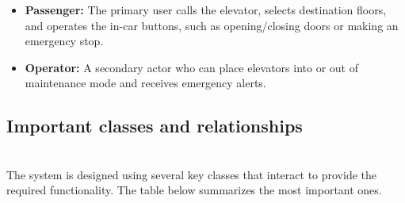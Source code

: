 \begin{itemize}
\item
\protect{}\label{2VJPYTyXepnmsSZQZ0NRs}
\textbf{Passenger:} The primary user calls the elevator, selects destination floors, and operates the in-car buttons, such as opening/closing doors or making an emergency stop.
\item
\protect{}\label{3ZUK4t2rGIq6sjB-JmLyc}
\textbf{Operator:} A secondary actor who can place elevators into or out of maintenance mode and receives emergency alerts.
\end{itemize}

\subsection{Important classes and relationships}\label{Q6YBtvgV3AELvMhCanKTC}
\\
The system is designed using several key classes that interact to provide the required functionality. The table below summarizes the most important ones.

